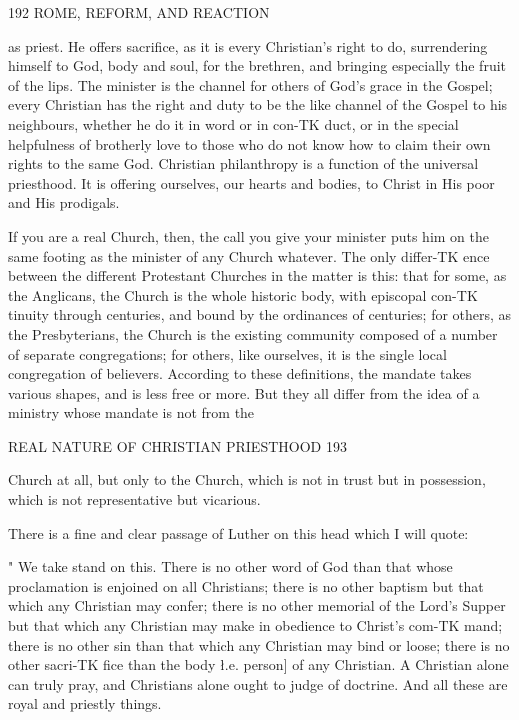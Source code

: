 \documentclass[12pt,a5paper,oneside]{book}
\begin{document}
{192 ROME, REFORM, AND REACTION 

as priest. He offers sacrifice, as it is every Christian's 
right to do, surrendering himself to God, body and soul, 
for the brethren, and bringing especially the fruit of 
the lips. The minister is the channel for others of 
God's grace in the Gospel; every Christian has the 
right and duty to be the like channel of the Gospel to 
his neighbours, whether he do it in word or in con-TK
duct, or in the special helpfulness of brotherly love to 
those who do not know how to claim their own rights 
to the same God. Christian philanthropy is a function 
of the universal priesthood. It is offering ourselves, 
our hearts and bodies, to Christ in His poor and His 
prodigals. 

If you are a real Church, then, the call you give 
your minister puts him on the same footing as the 
minister of any Church whatever. The only differ-TK
ence between the different Protestant Churches in the 
matter is this: that for some, as the Anglicans, the 
Church is the whole historic body, with episcopal con-TK
tinuity through centuries, and bound by the ordinances 
of centuries; for others, as the Presbyterians, the Church 
is the existing community composed of a number of 
separate congregations; for others, like ourselves, it is 
the single local congregation of believers. According 
to these definitions, the mandate takes various shapes, 
and is less free or more. But they all differ from the 
idea of a ministry whose mandate is not from the 



REAL NATURE OF CHRISTIAN PRIESTHOOD 193 

Church at all, but only to the Church, which is not in 
trust but in possession, which is not representative but 
vicarious. 

There is a fine and clear passage of Luther on this 
head which I will quote: 

" We take stand on this. There is no other word 
of God than that whose proclamation is enjoined on 
all Christians; there is no other baptism but that 
which any Christian may confer; there is no other 
memorial of the Lord's Supper but that which any 
Christian may make in obedience to Christ's com-TK
mand; there is no other sin than that which any 
Christian may bind or loose; there is no other sacri-TK
fice than the body \l.e. person] of any Christian. A 
Christian alone can truly pray, and Christians alone 
ought to judge of doctrine. And all these are royal 
and priestly things. 

}
\end{document}
